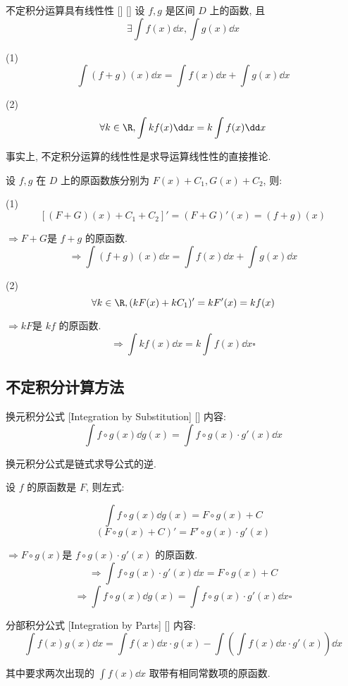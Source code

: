 \documentclass[UTF8]{ctexart}
\begin{document}
			\begin{ppt}
			    []
			    {不定积分运算具有线性性}
			    []
			    []
				设 \(f,g\) 是区间 \(D\) 上的函数, 且
				\[\exists\int f(x)\dd x,\int g(x)\dd x\]
				
				(1)\[\int (f+g)(x)\dd x=\int f(x)\dd x+\int g(x)\dd x\]
				
				(2)\[\forall k\in\R, \int kf(x)\dd x=k\int f(x)\dd x\]
			\end{ppt}
			
			\begin{prf}
				事实上, 不定积分运算的线性性是求导运算线性性的直接推论. 

				设 \(f,g\) 在 \(D\) 上的原函数族分别为 \(F(x)+C_1,G(x)+C_2\), 则: 
				
				(1)\[[(F+G)(x)+C_1+C_2]'=(F+G)'(x)=(f+g)(x)\]
				
				\(\Longrightarrow F+G\)是 \(f+g\) 的原函数. 
				\[\Longrightarrow \int (f+g)(x)\dd x=\int f(x)\dd x+\int g(x)\dd x\]
				
				(2)\[\forall k\in\R, (kF(x)+kC_1)'=kF'(x)=kf(x)\]
				
				\(\Longrightarrow kF\)是 \(kf\) 的原函数. 
				\[\Longrightarrow \int kf(x)\dd x=k\int f(x)\dd x\square\]
			\end{prf}
				
		\subsection{不定积分计算方法}
		
			\begin{thm}
			    []
			    {换元积分公式 }
			    [Integration by Substitution]
			    []
				内容: 
				\[\int f\circ g(x)\dd g(x)=\int f\circ g(x)\cdot g'(x)\dd x\]
			\end{thm}
			
			\begin{prf}
				换元积分公式是链式求导公式的逆. 
				
				设 \(f\) 的原函数是 \(F\), 则左式: 
				
				\[\int f\circ g(x)\dd g(x)=F\circ g(x)+C\]
				\[(F\circ g(x)+C)'=F'\circ g(x)\cdot g'(x)\]
				
				\(\Longrightarrow F\circ g(x)\)是 \(f\circ g(x)\cdot g'(x)\) 的原函数. 
				\[\Longrightarrow \int f\circ g(x)\cdot g'(x)\dd x=F\circ g(x)+C\]
				\[\Longrightarrow \int f\circ g(x)\dd g(x)=\int f\circ g(x)\cdot g'(x)\dd x\square\]
			\end{prf}
				
			\begin{thm}
			    []
			    {分部积分公式 }
			    [Integration by Parts]
			    []
				内容: 
				\[\int f(x)g(x)\dd x=\int f(x)\dd x\cdot g(x)-\int(\int f(x)\dd x \cdot g'(x))\dd x\]
				
				其中要求两次出现的 \(\int f(x)\dd x\) 取带有相同常数项的原函数. 
			\end{thm}
				
\end{document}
